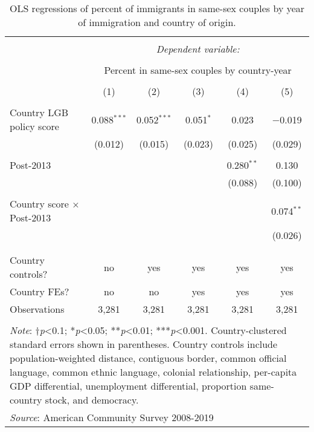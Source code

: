 \documentclass[
  11pt,
]{article}
\begin{document}
\begin{table}[!htbp] \centering 
  \caption{OLS regressions of percent of immigrants in same-sex couples by year of immigration and country of origin.} 
  \label{tab:country-props} 
\begin{tabular}{@{\extracolsep{5pt}}lccccc} 
\\[-1.8ex]\hline 
\hline \\[-1.8ex] 
 & \multicolumn{5}{c}{\textit{Dependent variable:}} \\ 
\cline{2-6} 
\\[-1.8ex] & \multicolumn{5}{c}{Percent in same-sex couples by country-year} \\ 
\\[-1.8ex] & (1) & (2) & (3) & (4) & (5)\\ 
\hline \\[-1.8ex] 
 Country LGB policy score & 0.088$^{***}$ & 0.052$^{***}$ & 0.051$^{*}$ & 0.023 & $-$0.019 \\ 
  & (0.012) & (0.015) & (0.023) & (0.025) & (0.029) \\ 
  & & & & & \\ 
 Post-2013 &  &  &  & 0.280$^{**}$ & 0.130 \\ 
  &  &  &  & (0.088) & (0.100) \\ 
  & & & & & \\ 
 Country score × Post-2013 &  &  &  &  & 0.074$^{**}$ \\ 
  &  &  &  &  & (0.026) \\ 
  & & & & & \\ 
\hline \\[-1.8ex] 
Country controls? & no & yes & yes & yes & yes \\ 
Country FEs? & no & no & yes & yes & yes \\ 
Observations & 3,281 & 3,281 & 3,281 & 3,281 & 3,281 \\ 
\hline 
\hline \\[-1.8ex] 
\multicolumn{6}{l}{\parbox[t]{.8\textwidth}{\textit{Note}: †\textit{p}<0.1; *\textit{p}<0.05; **\textit{p}<0.01; ***\textit{p}<0.001. Country-clustered standard errors shown in parentheses. Country controls include population-weighted distance, contiguous border, common official language, common ethnic language, colonial relationship, per-capita GDP differential, unemployment differential, proportion same-country stock, and democracy.}} \\ 
\multicolumn{6}{l}{\textit{Source}: American Community Survey 2008-2019} \\ 
\end{tabular} 
\end{table}
\end{document}

